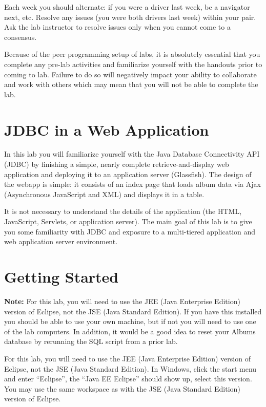 \documentclass[12pt]{scrartcl}
\begin{document}
Each week you should alternate: if you were a driver last week, 
be a navigator next, etc.  Resolve any issues (you were both drivers
last week) within your pair.  Ask the lab instructor to resolve issues
only when you cannot come to a consensus.  

Because of the peer programming setup of labs, it is absolutely 
essential that you complete any pre-lab activities and familiarize
yourself with the handouts prior to coming to lab.  Failure to do
so will negatively impact your ability to collaborate and work with 
others which may mean that you will not be able to complete the
lab.  

\section*{JDBC in a Web Application}

In this lab you will familiarize yourself with the Java Database 
Connectivity API (JDBC) by finishing a simple, nearly complete 
retrieve-and-display web application and deploying it to an 
application server (Glassfish).  The design of the webapp is 
simple: it consists of an index page that loads album data 
via Ajax (Asynchronous JavaScript and XML) and displays it in
a table.  

It is not necessary to understand the details of the application 
(the HTML, JavaScript, Servlets, or application server).  The 
main goal of this lab is to give you some familiarity with JDBC 
and exposure to a multi-tiered application and web application 
server environment.

\section*{Getting Started}

\textbf{Note:} For this lab, you will need to use the JEE (Java 
Enterprise Edition) version of Eclipse, not the JSE (Java Standard 
Edition).  If you have this installed you should be able to use your
own machine, but if not you will need to use one of the lab computers.
In addition, it would be a good idea to reset your Albums database 
by rerunning the SQL script from a prior lab.

For this lab, you will need to use the JEE (Java Enterprise Edition) 
version of Eclipse, not the JSE (Java Standard Edition).  In Windows, 
click the start menu and enter ``Eclipse'', the ``Java EE Eclipse'' 
should show up, select this version.  You may use the same workspace 
as with the JSE (Java Standard Edition) version of Eclipse.
\end{document}
